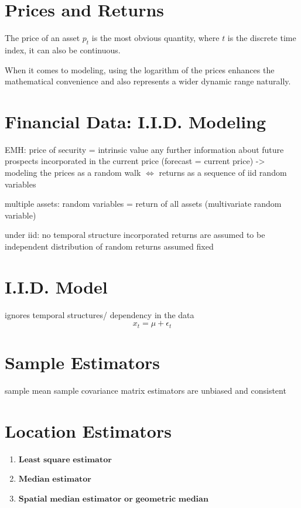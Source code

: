 

\section{Prices and Returns}

The price of an asset $p_t$ is the most obvious quantity, where $t$ is the discrete time index, it can also be continuous.

When it comes to modeling, using the logarithm of the prices enhances the mathematical convenience and also represents a wider dynamic range naturally.



\section{Financial Data: I.I.D. Modeling}
EMH: price of security = intrinsic value
any further information about future prospects incorporated in the current price (forecast = current price) 
-> modeling the prices as a random walk $\iff$ returns as a sequence of iid random variables

multiple assets: random variables = return of all assets (multivariate random variable)

under iid: no temporal structure incorporated returns are assumed to be independent distribution of random returns assumed fixed
\section{I.I.D. Model}
ignores temporal structures/ dependency in the data
\[x_t = \mu + \epsilon_t\]
\section{Sample Estimators}
sample mean
sample covariance matrix
estimators are unbiased and consistent
\section{Location Estimators}
\begin{enumerate}
    \item $\textbf{Least square estimator}$
    \item $\textbf{Median estimator}$
    \item $\textbf{Spatial median estimator or geometric median}$
\end{enumerate}

